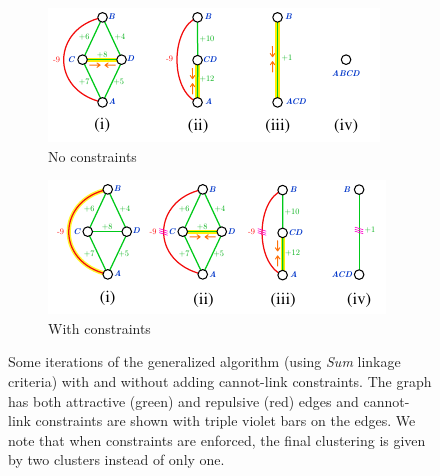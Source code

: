 \begin{figure}
\centering
        \begin{subfigure}[t]{0.46 \textwidth}
        \centering
        \includegraphics[width=\textwidth]{./figs/example_no_constr.pdf}
        \caption{No constraints}\label{subfig:no_constraints}
    \end{subfigure} \hfill
    \begin{subfigure}[t]{0.46 \textwidth}
        \centering
        \includegraphics[width=\textwidth]{./figs/example_with_constr.pdf}
        \caption{With constraints}\label{subfig:with_constraints}
    \end{subfigure}
\caption{Some iterations of the generalized algorithm (using \emph{Sum} linkage criteria) with and without adding cannot-link constraints. The graph has both attractive (green) and repulsive (red) edges and cannot-link constraints are shown with triple violet bars on the edges. We note that when constraints are enforced, the final clustering is given by two clusters instead of only one.}
\label{fig:algorithm_with_without_CLC}
\end{figure}
